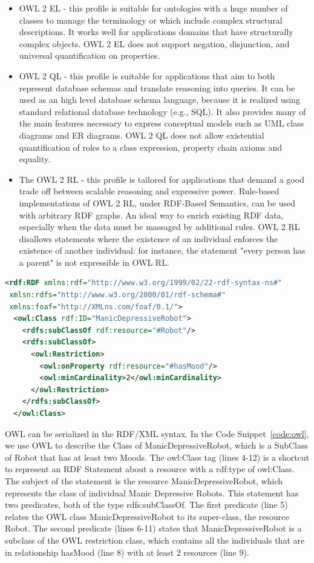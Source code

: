 \begin{itemize}
\item OWL 2 EL - this profile is suitable for ontologies with a huge number of classes to manage the terminology or which include complex structural descriptions. It works well for  applications domains that have structurally complex objects. OWL 2 EL does not support negation, disjunction, and universal quantification on properties.

\item OWL 2 QL  - this profile is suitable for applications that aim to both represent database schemas  and translate reasoning into queries. It can be used as an high level database schema language, because it is realized using standard relational database technology (e.g., SQL). It also provides many of the main features necessary to express conceptual models such as UML class diagrams and ER diagrams. OWL 2 QL does not allow existential quantification of roles to a class expression, property chain axioms and equality.
\item The OWL 2 RL - this profile is tailored for applications that demand a good trade off between scalable reasoning and expressive power. Rule-based implementations of OWL 2 RL, under RDF-Based Semantics, can be used with arbitrary RDF graphs. An ideal way to enrich existing RDF data, especially when the data must be massaged by additional rules. OWL 2 RL disallows statements where the existence of an individual enforces the existence of another individual: for instance, the statement "every person has a parent" is not expressible in OWL RL.

\end{itemize}

\begin{lstlisting}[language=XML, caption=An example of a simple OWL DL RDF/XML document:, label=code:owl]
<rdf:RDF xmlns:rdf="http://www.w3.org/1999/02/22-rdf-syntax-ns#"
 xmlsn:rdfs="http://www.w3.org/2000/01/rdf-schema#"
 xmlns:foaf="http://XMLns.com/foaf/0.1/">
  <owl:Class rdf:ID="ManicDepressiveRobot">
    <rdfs:subClassOf rdf:resource="#Robot"/>
    <rdfs:subClassOf>
      <owl:Restriction>
        <owl:onProperty rdf:resource="#hasMood"/>
        <owl:minCardinality>2</owl:minCardinality>
      </owl:Restriction>
    </rdfs:subClassOf>
  </owl:Class>
\end{lstlisting}

OWL can be serialized in the RDF/XML syntax. In the Code Snippet~\ref{code:owl}, we use OWL to describe the Class of ManicDepressiveRobot, which is a SubClass of Robot that has at least two Moods. The owl:Class tag (lines 4-12) is a shortcut to represent an RDF Statement about a resource with a rdf:type of owl:Class. The subject of the statement is the resource ManicDepressiveRobot, which represents the class of individual Manic Depressive Robots. This statement has two predicates, both of the type rdfs:subClassOf. The first predicate (line 5) relates the OWL class ManicDepressiveRobot to its super-class, the resource Robot. The second predicate (lines 6-11) states that ManicDepressiveRobot is a subclass of the OWL restriction class, which contains all the individuals that are in relationship hasMood (line 8) with at least 2 resources (line 9).


